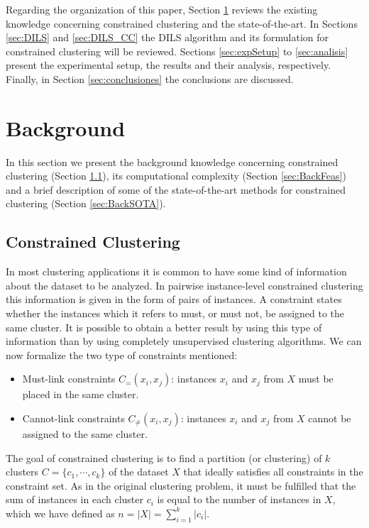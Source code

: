 \documentclass[review]{elsarticle}
\begin{document}
Regarding the organization of this paper, Section \ref{sec:background} reviews the existing knowledge concerning constrained clustering and the state-of-the-art. In Sections \ref{sec:DILS} and \ref{sec:DILS_CC} the DILS algorithm and its formulation for constrained clustering will be reviewed. Sections \ref{sec:expSetup} to \ref{sec:analisis} present the experimental setup, the results and their analysis, respectively. Finally, in Section \ref{sec:conclusiones} the conclusions are discussed.

\section{Background} \label{sec:background}

In this section we present the background knowledge concerning constrained clustering (Section \ref{sec:BackCC}), its computational complexity (Section \ref{sec:BackFeas}) and a brief description of some of the state-of-the-art methods for constrained clustering (Section \ref{sec:BackSOTA}).

\subsection{Constrained Clustering} \label{sec:BackCC}

In most clustering applications it is common to have some kind of information about the dataset to be analyzed. In pairwise instance-level constrained clustering this information is given in the form of pairs of instances. A constraint states whether the instances which it refers to must, or must not, be assigned to the same cluster. It is possible to obtain a better result by using this type of information than by using completely unsupervised clustering algorithms. We can now formalize the two type of constraints mentioned: 

\begin{itemize}

	\item Must-link constraints $C_=(x_i,x_j)$: instances $x_i$ and $x_j$ from $X$ must be placed in the same cluster.

	\item Cannot-link constraints $C_{\neq}(x_i,x_j)$: instances $x_i$ and $x_j$ from $X$ cannot be assigned to the same cluster.

\end{itemize}

The goal of constrained clustering is to find a partition (or clustering) of $k$ clusters $C = \{c_1, \cdots, c_k\}$ of the dataset $X$ that ideally satisfies all constraints in the constraint set. As in the original clustering problem, it must be fulfilled that the sum of instances in each cluster $c_i$ is equal to the number of instances in $X$, which we have defined as $n = |X| = \sum_{i = 1}^{k} |c_i|$.
\end{document}
